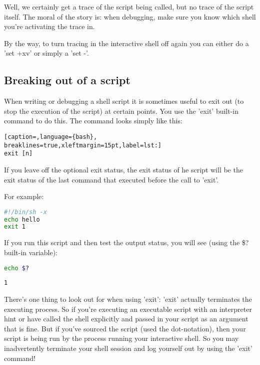 Well, we certainly get a trace of the script being called, but no trace of the
script itself. The moral of the story is: when debugging, make sure you know
which shell you're activating the trace in.

By the way, to turn tracing in the interactive shell off again you can either
do a 'set +xv' or simply a 'set -'.

\subsection{Breaking out of a script}
When writing or debugging a shell script it is sometimes useful to exit out (to
stop the execution of the script) at certain points. You use the 'exit'
built-in command to do this. The command looks simply like this:

\lstset{basicstyle=\scriptsize, numbers=left, captionpos=b, tabsize=4}
\begin{lstlisting}[caption=,language={bash},
breaklines=true,xleftmargin=15pt,label=lst:]
exit [n]
\end{lstlisting}

If you leave off the optional exit status, the exit status of he script will be
the exit status of the last command that executed before the call to 'exit'.

For example:
\lstset{basicstyle=\scriptsize, numbers=left, captionpos=b, tabsize=4}
\begin{lstlisting}[caption=Exiting from a script,language={bash},
breaklines=true,xleftmargin=15pt,label=lst:Exiting from a script]
#!/bin/sh -x
echo hello
exit 1
\end{lstlisting}

If you run this script and then test the output status, you will see (using the
\$? built-in variable):
\lstset{basicstyle=\scriptsize, numbers=left, captionpos=b, tabsize=4}
\begin{lstlisting}[caption=Checking the exit status,language={bash},
breaklines=true,xleftmargin=15pt,label=lst:Checking the exit status]
echo $?
\end{lstlisting}

\scriptsize
\begin{verbatim}
1
\end{verbatim}
\normalsize

There's one thing to look out for when using 'exit': 'exit' actually terminates
the executing process. So if you're executing an executable script with an
interpreter hint or have called the shell explicitly and passed in your script
as an argument that is fine. But if you've sourced the script (used the
dot-notation), then your script is being run by the process running your
interactive shell. So you may inadvertently terminate your shell session and
log yourself out by using the 'exit' command!

